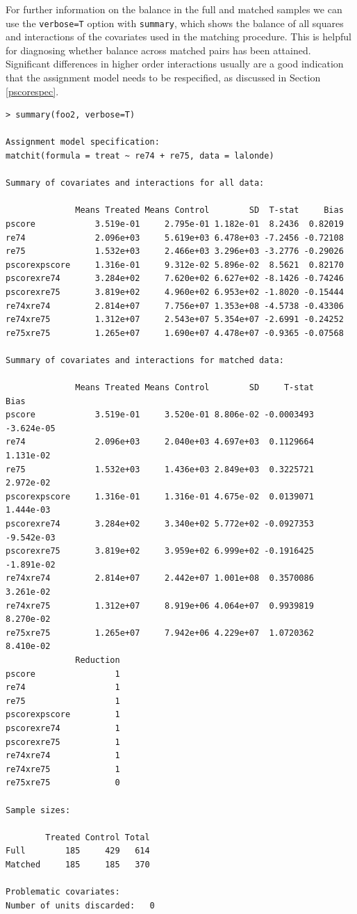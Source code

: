 \documentclass[oneside,letterpaper,titlepage]{article}
\begin{document}
For further information on the balance in the full and matched samples
we can use the {\tt verbose=T} option with {\tt summary}, which
shows the balance of all squares and interactions of the covariates
used in the matching procedure.  This is helpful for diagnosing whether balance across matched
pairs has been attained.  Significant differences in higher order
interactions usually are a good indication that the assignment model
needs to be respecified, as discussed in Section \ref{pscorespec}.

\begin{verbatim}
> summary(foo2, verbose=T)
 
Assignment model specification:
matchit(formula = treat ~ re74 + re75, data = lalonde)
 
Summary of covariates and interactions for all data:
 
              Means Treated Means Control        SD  T-stat     Bias
pscore            3.519e-01     2.795e-01 1.182e-01  8.2436  0.82019
re74              2.096e+03     5.619e+03 6.478e+03 -7.2456 -0.72108
re75              1.532e+03     2.466e+03 3.296e+03 -3.2776 -0.29026
pscorexpscore     1.316e-01     9.312e-02 5.896e-02  8.5621  0.82170
pscorexre74       3.284e+02     7.620e+02 6.627e+02 -8.1426 -0.74246
pscorexre75       3.819e+02     4.960e+02 6.953e+02 -1.8020 -0.15444
re74xre74         2.814e+07     7.756e+07 1.353e+08 -4.5738 -0.43306
re74xre75         1.312e+07     2.543e+07 5.354e+07 -2.6991 -0.24252
re75xre75         1.265e+07     1.690e+07 4.478e+07 -0.9365 -0.07568
 
Summary of covariates and interactions for matched data:
 
              Means Treated Means Control        SD     T-stat       Bias
pscore            3.519e-01     3.520e-01 8.806e-02 -0.0003493 -3.624e-05
re74              2.096e+03     2.040e+03 4.697e+03  0.1129664  1.131e-02
re75              1.532e+03     1.436e+03 2.849e+03  0.3225721  2.972e-02
pscorexpscore     1.316e-01     1.316e-01 4.675e-02  0.0139071  1.444e-03
pscorexre74       3.284e+02     3.340e+02 5.772e+02 -0.0927353 -9.542e-03
pscorexre75       3.819e+02     3.959e+02 6.999e+02 -0.1916425 -1.891e-02
re74xre74         2.814e+07     2.442e+07 1.001e+08  0.3570086  3.261e-02
re74xre75         1.312e+07     8.919e+06 4.064e+07  0.9939819  8.270e-02
re75xre75         1.265e+07     7.942e+06 4.229e+07  1.0720362  8.410e-02
              Reduction
pscore                1
re74                  1
re75                  1
pscorexpscore         1
pscorexre74           1
pscorexre75           1
re74xre74             1
re74xre75             1
re75xre75             0
 
Sample sizes:
 
        Treated Control Total
Full        185     429   614
Matched     185     185   370
 
Problematic covariates:
Number of units discarded:   0
\end{verbatim}
\end{document}
